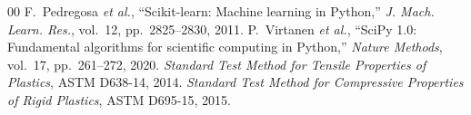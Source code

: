 \documentclass[conference,12pt]{IEEEtran}
\begin{document}
\begin{thebibliography}{00}
 F.~Pedregosa \textit{et al.}, ``Scikit-learn: Machine learning in Python,'' \textit{J. Mach. Learn. Res.}, vol.~12, pp.~2825--2830, 2011.
 P.~Virtanen \textit{et al.}, ``SciPy 1.0: Fundamental algorithms for scientific computing in Python,'' \textit{Nature Methods}, vol.~17, pp.~261--272, 2020.
 \textit{Standard Test Method for Tensile Properties of Plastics}, ASTM D638-14, 2014.
 \textit{Standard Test Method for Compressive Properties of Rigid Plastics}, ASTM D695-15, 2015.
\end{thebibliography}
\end{document}
